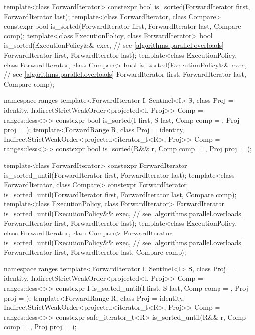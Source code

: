\begin{codeblock}
{  template<class ForwardIterator>
    constexpr bool is_sorted(ForwardIterator first, ForwardIterator last);
  template<class ForwardIterator, class Compare>
    constexpr bool is_sorted(ForwardIterator first, ForwardIterator last,
                             Compare comp);
  template<class ExecutionPolicy, class ForwardIterator>
    bool is_sorted(ExecutionPolicy&& exec, // see \ref{algorithms.parallel.overloads}
                   ForwardIterator first, ForwardIterator last);
  template<class ExecutionPolicy, class ForwardIterator, class Compare>
    bool is_sorted(ExecutionPolicy&& exec, // see \ref{algorithms.parallel.overloads}
                   ForwardIterator first, ForwardIterator last,
                   Compare comp);

  namespace ranges {
    template<ForwardIterator I, Sentinel<I> S, class Proj = identity,
        IndirectStrictWeakOrder<projected<I, Proj>> Comp = ranges::less<>>
      constexpr bool is_sorted(I first, S last, Comp comp = {}, Proj proj = {});
    template<ForwardRange R, class Proj = identity,
        IndirectStrictWeakOrder<projected<iterator_t<R>, Proj>> Comp = ranges::less<>>
      constexpr bool is_sorted(R&& r, Comp comp = {}, Proj proj = {});
  }

  template<class ForwardIterator>
    constexpr ForwardIterator
      is_sorted_until(ForwardIterator first, ForwardIterator last);
  template<class ForwardIterator, class Compare>
    constexpr ForwardIterator
      is_sorted_until(ForwardIterator first, ForwardIterator last,
                      Compare comp);
  template<class ExecutionPolicy, class ForwardIterator>
    ForwardIterator
      is_sorted_until(ExecutionPolicy&& exec, // see \ref{algorithms.parallel.overloads}
                      ForwardIterator first, ForwardIterator last);
  template<class ExecutionPolicy, class ForwardIterator, class Compare>
    ForwardIterator
      is_sorted_until(ExecutionPolicy&& exec, // see \ref{algorithms.parallel.overloads}
                      ForwardIterator first, ForwardIterator last,
                      Compare comp);

  namespace ranges {
    template<ForwardIterator I, Sentinel<I> S, class Proj = identity,
        IndirectStrictWeakOrder<projected<I, Proj>> Comp = ranges::less<>>
      constexpr I is_sorted_until(I first, S last, Comp comp = {}, Proj proj = {});
    template<ForwardRange R, class Proj = identity,
        IndirectStrictWeakOrder<projected<iterator_t<R>, Proj>> Comp = ranges::less<>>
      constexpr safe_iterator_t<R>
        is_sorted_until(R&& r, Comp comp = {}, Proj proj = {});
  }

}
\end{codeblock}
